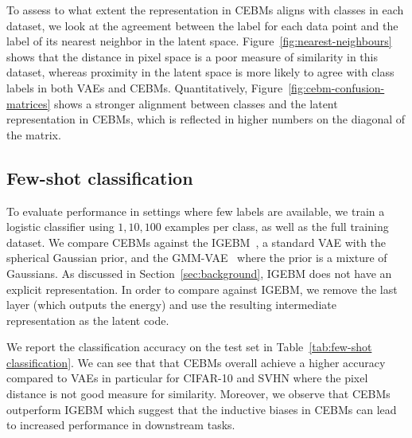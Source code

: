 \documentclass[tablecaption=bottom,wcp]{jmlr} %
\begin{document}
To assess to what extent the representation in CEBMs aligns with classes in each dataset, we look at the agreement between the label for each data point and the label of its nearest neighbor in the latent space. Figure~\ref{fig:nearest-neighbours} shows that the distance in pixel space is a poor measure of similarity in this dataset, whereas proximity in the latent space is more likely to agree with class labels in both VAEs and CEBMs. 
Quantitatively, Figure~\ref{fig:cebm-confusion-matrices} shows a stronger alignment between classes and the latent representation in CEBMs, which is reflected in higher numbers on the diagonal of the matrix.

\vspace*{-1.0ex}
\subsection{Few-shot classification}\label{sec:exp:fewshots}
\vspace*{-1.0ex}

To evaluate performance in settings where few labels are available, we train a logistic classifier using $1, 10, 100$ examples per class, as well as the full training dataset. We compare CEBMs against the  IGEBM~\cite{du2019implicit}, a standard VAE  with the spherical Gaussian prior, and the GMM-VAE~\cite{tomczak2018vae} where the prior is a mixture of Gaussians. As discussed in Section~\ref{sec:background}, IGEBM does not have an explicit representation. In order to compare against IGEBM, we remove the last layer (which outputs the energy) and use the resulting intermediate representation as the latent code. 

We report the classification accuracy on the test set in Table~\ref{tab:few-shot classification}. We can see that that CEBMs overall achieve a higher accuracy compared to VAEs in particular for CIFAR-10 and SVHN where the pixel distance is not good measure for similarity. Moreover, we observe that CEBMs outperform IGEBM which suggest that the inductive biases in CEBMs can lead to increased performance in downstream tasks. 
\end{document}

